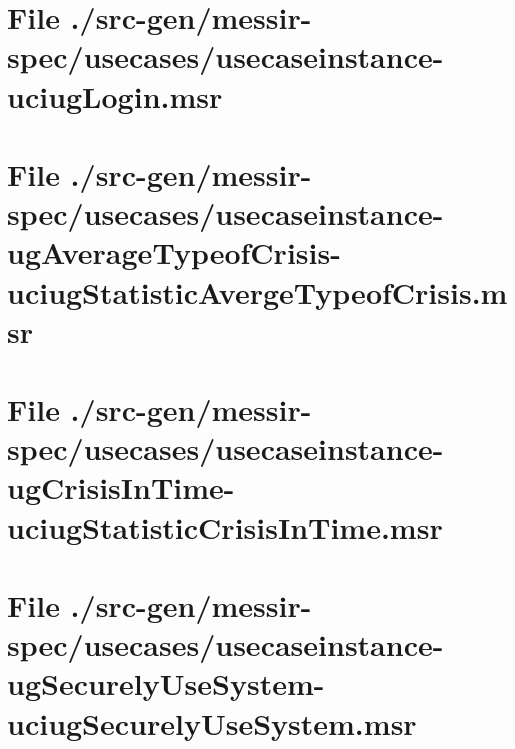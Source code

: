 \section[File /src-gen/messir-spec/usecases/usecaseinstance-uciugLogin.msr]{File ./src-gen/messir-spec/usecases/usecaseinstance-uciugLogin.msr}
\scriptsize

\normalsize
	
\section[File /.../usecaseinstance-ugAverageTypeofCrisis-uciugStatisticAvergeTypeofCrisis.msr]{File ./src-gen/messir-spec/usecases/usecaseinstance-ugAverageTypeofCrisis-uciugStatisticAvergeTypeofCrisis.msr}
\scriptsize

\normalsize
	
\section[File /src-gen.../usecaseinstance-ugCrisisInTime-uciugStatisticCrisisInTime.msr]{File ./src-gen/messir-spec/usecases/usecaseinstance-ugCrisisInTime-uciugStatisticCrisisInTime.msr}
\scriptsize

\normalsize
	
\section[File /src-gen.../usecaseinstance-ugSecurelyUseSystem-uciugSecurelyUseSystem.msr]{File ./src-gen/messir-spec/usecases/usecaseinstance-ugSecurelyUseSystem-uciugSecurelyUseSystem.msr}
\scriptsize

\normalsize
	
